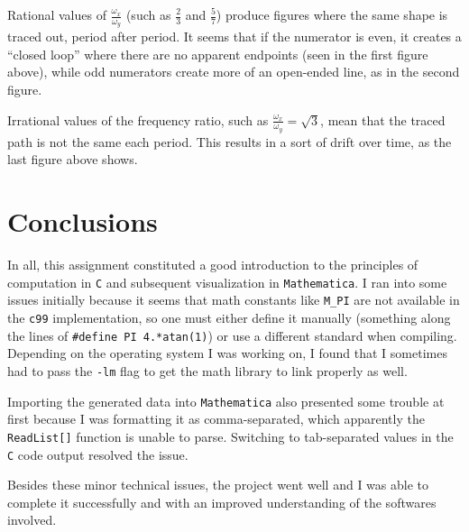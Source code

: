 \documentclass{article}
\begin{document}
Rational values of $\frac{\omega_x}{\omega_y}$ (such as $\frac{2}{3}$ and $\frac{5}{7}$) produce figures where the same shape is traced out, period after period. It seems that if the numerator is even, it creates a ``closed loop'' where there are no apparent endpoints (seen in the first figure above), while odd numerators create more of an open-ended line, as in the second figure.

Irrational values of the frequency ratio, such as $\frac{\omega_x}{\omega_y}=\sqrt{3}$, mean that the traced path is not the same each period. This results in a sort of drift over time, as the last figure above shows.

\section{Conclusions}

In all, this assignment constituted a good introduction to the principles of computation in \texttt{C} and subsequent visualization in \texttt{Mathematica}. I ran into some issues initially because it seems that math constants like \texttt{M\_PI} are not available in the \texttt{c99} implementation, so one must either define it manually (something along the lines of \texttt{\#define PI 4.*atan(1)}) or use a different standard when compiling. Depending on the operating system I was working on, I found that I sometimes had to pass the \texttt{-lm} flag to get the math library to link properly as well.

Importing the generated data into \texttt{Mathematica} also presented some trouble at first because I was formatting it as comma-separated, which apparently the \texttt{ReadList[]} function is unable to parse. Switching to tab-separated values in the \texttt{C} code output resolved the issue.

Besides these minor technical issues, the project went well and I was able to complete it successfully and with an improved understanding of the softwares involved.
\end{document}
